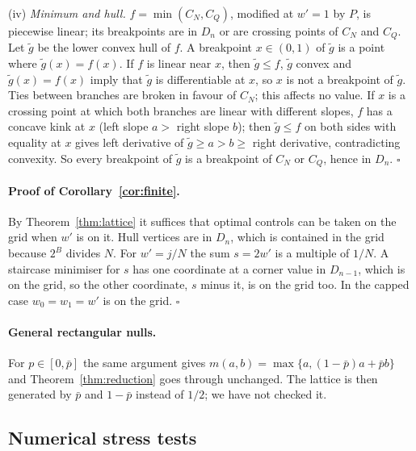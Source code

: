 \documentclass{article}
\theoremstyle{plain}
\theoremstyle{definition}
\theoremstyle{remark}
\begin{document}
(iv) \emph{Minimum and hull.} $f=\min(C_N,C_Q)$, modified at $w'=1$ by $P$, is piecewise linear; its breakpoints are in $D_n$ or are crossing points of $C_N$ and $C_Q$. Let $\tilde g$ be the lower convex hull of $f$. A breakpoint $x\in(0,1)$ of $\tilde g$ is a point where $\tilde g(x)=f(x)$. If $f$ is linear near $x$, then $\tilde g\le f$, $\tilde g$ convex and $\tilde g(x)=f(x)$ imply that $\tilde g$ is differentiable at $x$, so $x$ is not a breakpoint of $\tilde g$. Ties between branches are broken in favour of $C_N$; this affects no value. If $x$ is a crossing point at which both branches are linear with different slopes, $f$ has a concave kink at $x$ (left slope $a>$ right slope $b$); then $\tilde g\le f$ on both sides with equality at $x$ gives left derivative of $\tilde g\ge a>b\ge$ right derivative, contradicting convexity. So every breakpoint of $\tilde g$ is a breakpoint of $C_N$ or $C_Q$, hence in $D_n$. \hfill$\square$

\paragraph{Proof of Corollary~\ref{cor:finite}.} By Theorem~\ref{thm:lattice} it suffices that optimal controls can be taken on the grid when $w'$ is on it. Hull vertices are in $D_n$, which is contained in the grid because $2^B$ divides $N$. For $w'=j/N$ the sum $s=2w'$ is a multiple of $1/N$. A staircase minimiser for $s$ has one coordinate at a corner value in $D_{n-1}$, which is on the grid, so the other coordinate, $s$ minus it, is on the grid too. In the capped case $w_0=w_1=w'$ is on the grid. \hfill$\square$

\paragraph{General rectangular nulls.} For $p\in[0,\bar p]$ the same argument gives $m(a,b)=\max\{a,(1-\bar p)a+\bar pb\}$ and Theorem~\ref{thm:reduction} goes through unchanged. The lattice is then generated by $\bar p$ and $1-\bar p$ instead of $1/2$; we have not checked it.

\subsection{Numerical stress tests}
\label{app:stress}
\end{document}
